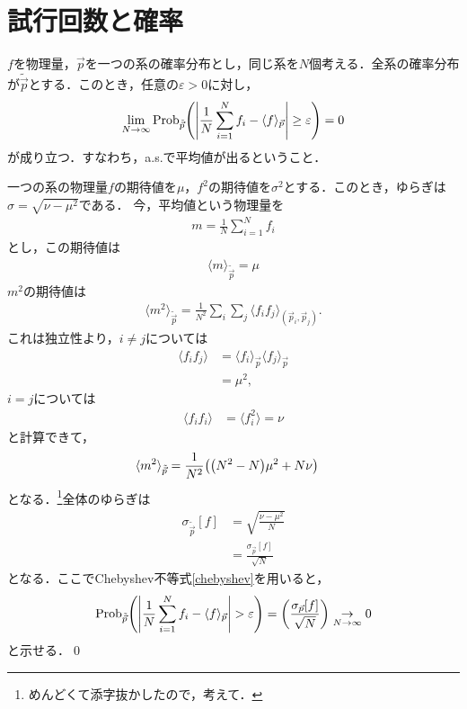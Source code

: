 \section{試行回数と確率}
  \begin{thm}[大数の法則]
    $f$を物理量，$\vec{p}$を一つの系の確率分布とし，同じ系を$N$個考える．全系の確率分布が$\tilde{\vec{p}}$とする．このとき，任意の$\varepsilon>0$に対し，
    \begin{align}
      \lim_{N\to\infty}\mathrm{Prob}_{\tilde{\vec{p}}}\qty(\abs{\frac{1}{N}\sum_{i=1}^{N}f_i - \langle f \rangle_{\vec{p}}}\geq \varepsilon ) = 0
    \end{align}
    が成り立つ．すなわち，a.s.で平均値が出るということ．
  \end{thm}
  \begin{pr}
    一つの系の物理量$f$の期待値を$\mu$，$f^2$の期待値を$\sigma^2$とする．このとき，ゆらぎは$\sigma = \sqrt{\nu - \mu^2}$である．
    今，平均値という物理量を
    \begin{align}
      m = \frac{1}{N} \sum_{i=1}^{N}f_i
    \end{align}
    とし，この期待値は
    \begin{align}
      \langle m \rangle_{\tilde{\vec{p}}} = \mu
    \end{align}
    $m^2$の期待値は
    \begin{align}
      \langle m^2 \rangle_{\tilde\vec{p}} = \frac{1}{N^2} \sum_{i}\sum_{j}\langle f_if_j\rangle_{(\vec{p}_i,\vec{p}_j)}.
    \end{align}
    これは独立性より，$i\neq j$については
    \begin{align}
      \langle f_if_j \rangle &= \langle f_i \rangle_{\vec{p}} \langle f_j \rangle_{\vec{p}}\\
      &= \mu^2,
    \end{align}
    $i=j$については
    \begin{align}
      \langle f_i f_i \rangle &= \langle f_i^2 \rangle = \nu
    \end{align}
    と計算できて，
    \begin{align}
      \langle m^2 \rangle _{\tilde{\vec{p}}} &= \frac{1}{N^2} \qty(\qty(N^2 - N)\mu^2 + N\nu)
    \end{align}
    となる．\footnote{めんどくて添字抜かしたので，考えて．}全体のゆらぎは
    \begin{align}
      \sigma_{\tilde{\vec{p}}}[f] &= \sqrt{\frac{\nu-\mu^2}{N}}\\
      &= \frac{\sigma_{\vec{p}}[f]}{\sqrt{N}}
    \end{align}
    となる．ここでChebyshev不等式\eqref{chebyshev}を用いると，
    \begin{align}
      \mathrm{Prob}_{\tilde{\vec{p}}}\qty(\abs{\frac{1}{N}\sum_{i=1}^{N}f_i - \langle f \rangle_{\vec{p}}} > \varepsilon) = \qty(\frac{\sigma_{\vec{p}}[f]}{\sqrt{N}}) \underset{N \to \infty}{\to} 0
    \end{align}
    と示せる．\qed
  \end{pr}
